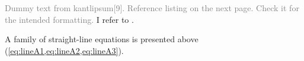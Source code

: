 \textcolor{gray}{Dummy text from kantlipsum[9]. Reference listing on the next page. Check it for the intended formatting.} I refer to \citep{lamport94,kopka2004guide,baczkowski1990ndsu}. 


A family of straight-line equations is presented above (\cref{eq:lineA1,eq:lineA2,eq:lineA3}).

\kant[10]

\checkEndRefsection%

